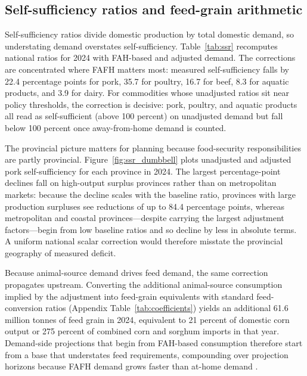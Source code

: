 \documentclass[preprint,12pt,authoryear]{elsarticle}
\begin{document}
\subsection{Self-sufficiency ratios and feed-grain arithmetic}
\label{subsec:app_ssr}

Self-sufficiency ratios divide domestic production by total domestic demand, so understating demand overstates self-sufficiency. Table~\ref{tab:ssr} recomputes national ratios for 2024 with FAH-based and adjusted demand. The corrections are concentrated where FAFH matters most: measured self-sufficiency falls by 22.4 percentage points for pork, 35.7 for poultry, 16.7 for beef, 8.3 for aquatic products, and 3.9 for dairy. For commodities whose unadjusted ratios sit near policy thresholds, the correction is decisive: pork, poultry, and aquatic products all read as self-sufficient (above 100 percent) on unadjusted demand but fall below 100 percent once away-from-home demand is counted.

The provincial picture matters for planning because food-security responsibilities are partly provincial. Figure~\ref{fig:ssr_dumbbell} plots unadjusted and adjusted pork self-sufficiency for each province in 2024. The largest percentage-point declines fall on high-output surplus provinces rather than on metropolitan markets: because the decline scales with the baseline ratio, provinces with large production surpluses see reductions of up to 84.4 percentage points, whereas metropolitan and coastal provinces---despite carrying the largest adjustment factors---begin from low baseline ratios and so decline by less in absolute terms. A uniform national scalar correction would therefore misstate the provincial geography of measured deficit.

Because animal-source demand drives feed demand, the same correction propagates upstream. Converting the additional animal-source consumption implied by the adjustment into feed-grain equivalents with standard feed-conversion ratios (Appendix Table~\ref{tab:coefficients}) yields an additional 61.6 million tonnes of feed grain in 2024, equivalent to 21 percent of domestic corn output or 275 percent of combined corn and sorghum imports in that year. Demand-side projections that begin from FAH-based consumption therefore start from a base that understates feed requirements, compounding over projection horizons because FAFH demand grows faster than at-home demand \citep{BaiSealeWahl2020, FukaseMartin2016}.
\end{document}
